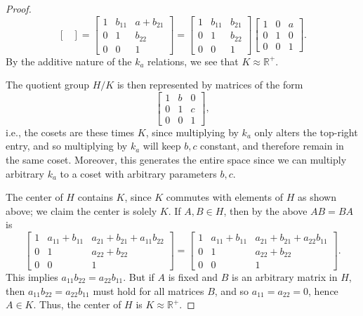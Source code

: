 \documentclass[12pt]{article}
\theoremstyle{remark}
\begin{document}
\begin{proof}
\begin{equation*}
\begin{bmatrix}
    \end{bmatrix}
    =
    \begin{bmatrix}
      1 & b_{11} & a + b_{21}\\
      0 & 1 & b_{22}\\
      0 & 0 & 1
    \end{bmatrix}
    =
    \begin{bmatrix}
      1 & b_{11} & b_{21}\\
      0 & 1 & b_{22}\\
      0 & 0 & 1
    \end{bmatrix}
    \begin{bmatrix}
      1 & 0 & a\\
      0 & 1 & 0\\
      0 & 0 & 1
    \end{bmatrix}.
  \end{equation*}
  By the additive nature of the $k_a$ relations, we see that $K \approx \mathbb{R}^+$.
  \par The quotient group $H/K$ is then represented by matrices of the form
  \begin{equation*}
     \begin{bmatrix}
      1 & b & 0\\
      0 & 1 & c\\
      0 & 0 & 1
    \end{bmatrix},
  \end{equation*}
  i.e., the cosets are these times $K$, since multiplying by $k_a$ only alters the top-right entry, and so multiplying by $k_a$ will keep $b,c$ constant, and therefore remain in the same coset. Moreover, this generates the entire space since we can multiply arbitrary $k_a$ to a coset with arbitrary parameters $b,c$.
  \par The center of $H$ contains $K$, since $K$ commutes with elements of $H$ as shown above; we claim the center is solely $K$. If $A,B \in H$, then by the above $AB = BA$ is
  \begin{equation*}
    \begin{bmatrix}
      1 & a_{11}+b_{11} & a_{21} + b_{21} + a_{11}b_{22}\\
      0 & 1 & a_{22} + b_{22}\\
      0 & 0 & 1
    \end{bmatrix} = \begin{bmatrix}
      1 & a_{11}+b_{11} & a_{21} + b_{21} + a_{22}b_{11}\\
      0 & 1 & a_{22} + b_{22}\\
      0 & 0 & 1
    \end{bmatrix}.
  \end{equation*}
  This implies $a_{11}b_{22} = a_{22}b_{11}$. But if $A$ is fixed and $B$ is an arbitrary matrix in $H$, then $a_{11}b_{22} = a_{22}b_{11}$ must hold for all matrices $B$, and so $a_{11} = a_{22} = 0$, hence $A \in K$. Thus, the center of $H$ is $K \approx \mathbb{R}^+$.
\end{proof}
\end{document}
